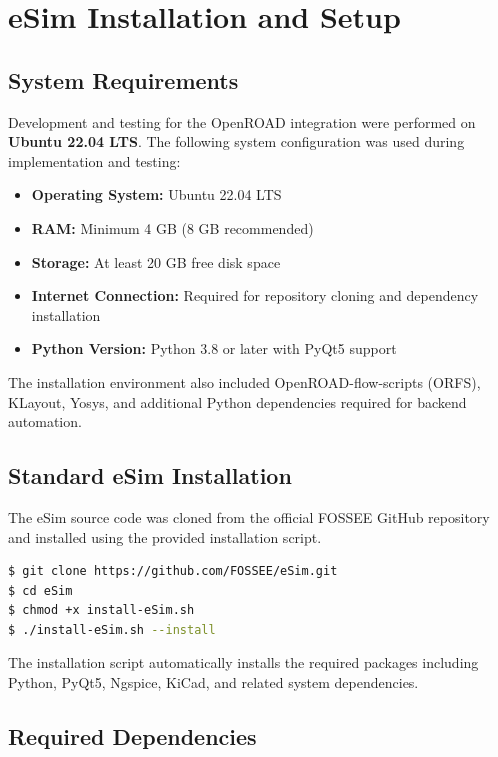 \chapter{eSim Installation and Setup}

\section{System Requirements}

Development and testing for the OpenROAD integration were performed on \textbf{Ubuntu 22.04 LTS}. The following system configuration was used during implementation and testing:

\begin{itemize}
    \item \textbf{Operating System:} Ubuntu 22.04 LTS
    \item \textbf{RAM:} Minimum 4 GB (8 GB recommended)
    \item \textbf{Storage:} At least 20 GB free disk space
    \item \textbf{Internet Connection:} Required for repository cloning and dependency installation
    \item \textbf{Python Version:} Python 3.8 or later with PyQt5 support
\end{itemize}

The installation environment also included OpenROAD-flow-scripts (ORFS), KLayout, Yosys, and additional Python dependencies required for backend automation.

\section{Standard eSim Installation}

The eSim source code was cloned from the official FOSSEE GitHub repository and installed using the provided installation script.

\begin{lstlisting}[language=bash, caption={Standard eSim installation commands.}]
$ git clone https://github.com/FOSSEE/eSim.git
$ cd eSim
$ chmod +x install-eSim.sh
$ ./install-eSim.sh --install
\end{lstlisting}

The installation script automatically installs the required packages including Python, PyQt5, Ngspice, KiCad, and related system dependencies.

\section{Required Dependencies}

